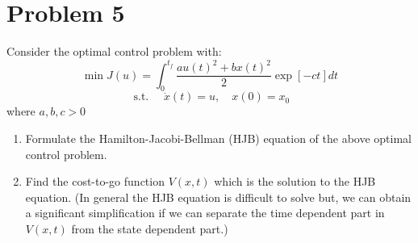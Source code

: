 \documentclass[10pt,a4paper,oneside]{article}
\begin{document}
\section* {Problem 5} 
Consider the optimal control problem with:
\[
\min J(u)=\int_{0}^{t_{f}} \frac{a u(t)^{2}+b x(t)^{2}}{2} \exp [-c t] d t
\]
\[
\text { s.t. } \quad \dot{x}(t)=u, \quad x(0)=x_{0}
\]
where $a, b, c>0$
\begin{enumerate}
\item Formulate the Hamilton-Jacobi-Bellman (HJB) equation of the above optimal control problem.
\item Find the cost-to-go function $V(x, t)$ which is the solution to the HJB equation. (In general
the HJB equation is difficult to solve but, we can obtain a significant simplification if we can
separate the time dependent part in $V(x, t)$ from the state dependent part.)
\end{enumerate}
\end{document}
